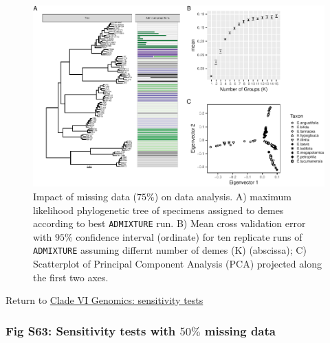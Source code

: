 \documentclass[
  11pt,
]{article}
\begin{document}
\begin{figure}
\includegraphics{Supplementary_Material_files/figure-latex/cladeVIgenomicSensitivityAnalysesLargestplots-1} \caption{Impact of missing data ($75\%$) on data analysis. A) maximum likelihood phylogenetic tree of specimens assigned to demes according to best \texttt{ADMIXTURE} run. B) Mean cross validation error with $95\%$ confidence interval (ordinate) for ten replicate runs of \texttt{ADMIXTURE} assuming differnt number of demes (K) (abscissa); C) Scatterplot of Principal Component Analysis (PCA) projected along the first two axes.}\label{fig:cladeVIgenomicSensitivityAnalysesLargestplots}
\end{figure}

Return to \protect\hyperlink{sensitivity-tests-5}{Clade VI Genomics: sensitivity tests}
\pagebreak

\hypertarget{fig-s63-sensitivity-tests-with-50-missing-data}{%
\subsubsection{\texorpdfstring{Fig S63: Sensitivity tests with \(50\%\) missing data}{Fig S63: Sensitivity tests with 50\textbackslash\% missing data}}\label{fig-s63-sensitivity-tests-with-50-missing-data}}
\end{document}
